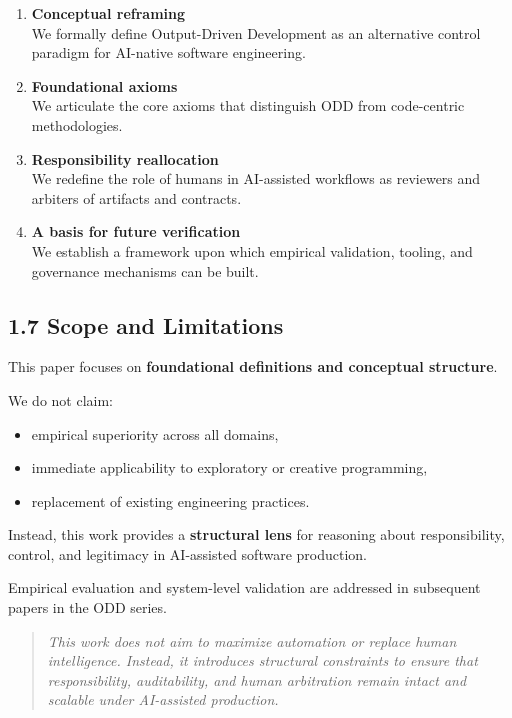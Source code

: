 \documentclass[
]{article}
\begin{document}
\begin{enumerate}
\def\labelenumi{\arabic{enumi}.}
\item
  \textbf{Conceptual reframing}\\
  We formally define Output-Driven Development as an alternative control
  paradigm for AI-native software engineering.
\item
  \textbf{Foundational axioms}\\
  We articulate the core axioms that distinguish ODD from code-centric
  methodologies.
\item
  \textbf{Responsibility reallocation}\\
  We redefine the role of humans in AI-assisted workflows as reviewers
  and arbiters of artifacts and contracts.
\item
  \textbf{A basis for future verification}\\
  We establish a framework upon which empirical validation, tooling, and
  governance mechanisms can be built.
\end{enumerate}

\hypertarget{17-scope-and-limitations}{%
\subsection{1.7 Scope and Limitations}\label{17-scope-and-limitations}}

This paper focuses on \textbf{foundational definitions and conceptual
structure}.

We do not claim:

\begin{itemize}
\item
  empirical superiority across all domains,
\item
  immediate applicability to exploratory or creative programming,
\item
  replacement of existing engineering practices.
\end{itemize}

Instead, this work provides a \textbf{structural lens} for reasoning
about responsibility, control, and legitimacy in AI-assisted software
production.

Empirical evaluation and system-level validation are addressed in
subsequent papers in the ODD series.

\begin{quote}
\emph{This work does not aim to maximize automation or replace human
intelligence. Instead, it introduces structural constraints to ensure
that responsibility, auditability, and human arbitration remain intact
and scalable under AI-assisted production.}
\end{quote}
\end{document}

